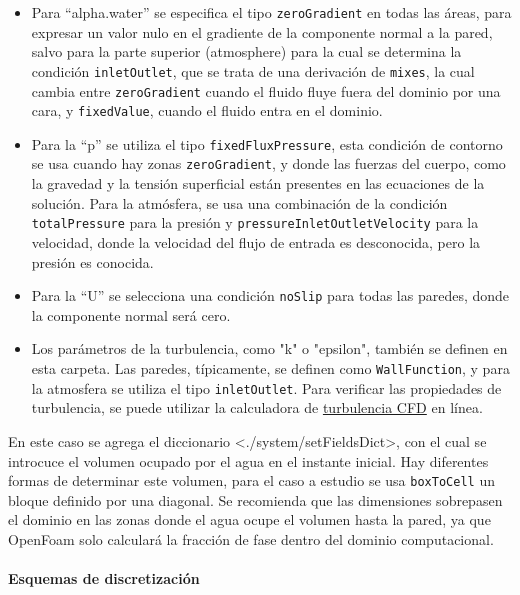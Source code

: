 \begin{itemize}
\item
  Para ``alpha.water'' se especifica el tipo \texttt{zeroGradient} en
  todas las áreas, para expresar un valor nulo en el gradiente de la
  componente normal a la pared, salvo para la parte superior
  (atmosphere) para la cual se determina la condición
  \texttt{inletOutlet}, que se trata de una derivación de
  \texttt{mixes}, la cual cambia entre \texttt{zeroGradient} cuando el
  fluido fluye fuera del dominio por una cara, y \texttt{fixedValue},
  cuando el fluido entra en el dominio.
\item
  Para la ``p'' se utiliza el tipo \texttt{fixedFluxPressure}, esta
  condición de contorno se usa cuando hay zonas \texttt{zeroGradient}, y
  donde las fuerzas del cuerpo, como la gravedad y la tensión
  superficial están presentes en las ecuaciones de la solución. Para la
  atmósfera, se usa una combinación de la condición
  \texttt{totalPressure} para la presión y
  \texttt{pressureInletOutletVelocity} para la velocidad, donde la
  velocidad del flujo de entrada es desconocida, pero la presión es
  conocida.
\item
  Para la ``U'' se selecciona una condición \texttt{noSlip} para todas
  las paredes, donde la componente normal será cero.
\item
  Los parámetros de la turbulencia, como "k" o "epsilon", también se
  definen en esta carpeta. Las paredes, típicamente, se definen como
  \texttt{WallFunction}, y para la atmosfera se utiliza el tipo
  \texttt{inletOutlet}. Para verificar las propiedades de turbulencia,
  se puede utilizar la calculadora de
  \href{http://www.cfd-online.com/Tools/turbulence.php}{turbulencia CFD}
  en línea.
\end{itemize}

En este caso se agrega el diccionario
\textless{}./system/setFieldsDict\textgreater{}, con el cual se
introcuce el volumen ocupado por el agua en el instante inicial. Hay
diferentes formas de determinar este volumen, para el caso a estudio se
usa \texttt{boxToCell} un bloque definido por una diagonal. Se
recomienda que las dimensiones sobrepasen el dominio en las zonas donde
el agua ocupe el volumen hasta la pared, ya que OpenFoam solo calculará
la fracción de fase dentro del dominio computacional.

\paragraph{Esquemas de discretización}\label{header-n199}


